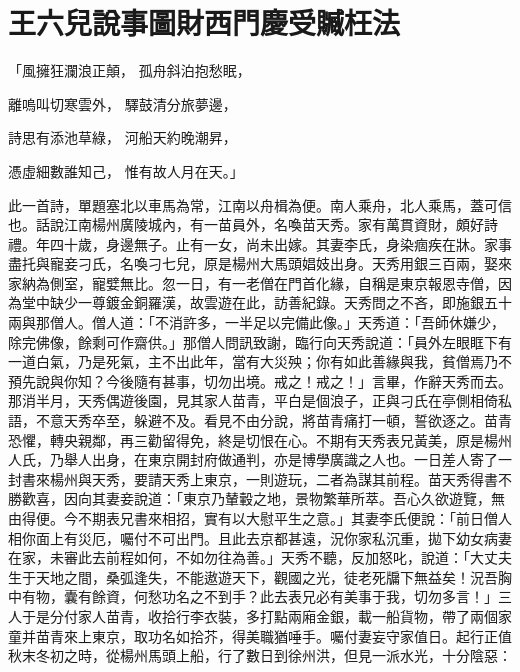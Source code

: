 %

\chapter{王六兒說事圖財\KG 西門慶受贓枉法}


\begin{showcontents}{}



「風擁狂瀾浪正顛，  孤舟斜泊抱愁眠，

離嗚叫切寒雲外，  驛鼓清分旅夢邊，

詩思有添池草綠，  河船天約晚潮昇，

憑虛細數誰知己，  惟有故人月在天。」

此一首詩，單題塞北以車馬為常，江南以舟楫為便。南人乘舟，北人乘馬，蓋可信也。話說江南楊州廣陵城內，有一苗員外，名喚苗天秀。家有萬貫資財，頗好詩禮。年四十歲，身邊無子。止有一女，尚未出嫁。其妻李氏，身染痼疾在牀。家事盡托與寵妾刁氏，名喚刁七兒，原是楊州大馬頭娼妓出身。天秀用銀三百兩，娶來家納為側室，寵嬖無比。忽一日，有一老僧在門首化緣，自稱是東京報恩寺僧，因為堂中缺少一尊鍍金銅羅漢，故雲遊在此，訪善紀錄。天秀問之不吝，即施銀五十兩與那僧人。僧人道：「不消許多，一半足以完備此像。」天秀道：「吾師休嫌少，除完佛像，餘剩可作齋供。」那僧人問訊致謝，臨行向天秀說道：「員外左眼眶下有一道白氣，乃是死氣，主不出此年，當有大災殃；你有如此善緣與我，貧僧焉乃不預先說與你知？今後隨有甚事，切勿出境。戒之！戒之！」言畢，作辭天秀而去。那消半月，天秀偶遊後園，見其家人苗青，平白是個浪子，正與刁氏在亭側相倚私語，不意天秀卒至，躲避不及。看見不由分說，將苗青痛打一頓，誓欲逐之。苗青恐懼，轉央親鄰，再三勸留得免，終是切恨在心。不期有天秀表兄黃美，原是楊州人氏，乃舉人出身，在東京開封府做通判，亦是博學廣識之人也。一日差人寄了一封書來楊州與天秀，要請天秀上東京，一則遊玩，二者為謀其前程。苗天秀得書不勝歡喜，因向其妻妾說道：「東京乃輦轂之地，景物繁華所萃。吾心久欲遊覽，無由得便。今不期表兄書來相招，實有以大慰平生之意。」其妻李氏便說：「前日僧人相你面上有災厄，囑付不可出門。且此去京都甚遠，況你家私沉重，拋下幼女病妻在家，未審此去前程如何，不如勿往為善。」天秀不聽，反加怒叱，說道：「大丈夫生于天地之間，桑弧逢失，不能遨遊天下，觀國之光，徒老死牖下無益矣！況吾胸中有物，囊有餘資，何愁功名之不到手？此去表兄必有美事于我，切勿多言！」三人于是分付家人苗青，收拾行李衣裝，多打點兩廂金銀，載一船貨物，帶了兩個家童并苗青來上東京，取功名如拾芥，得美職猶唾手。囑付妻妄守家值日。起行正值秋末冬初之時，從楊州馬頭上船，行了數日到徐州洪，但見一派水光，十分陰惡：


\end{showcontents}
